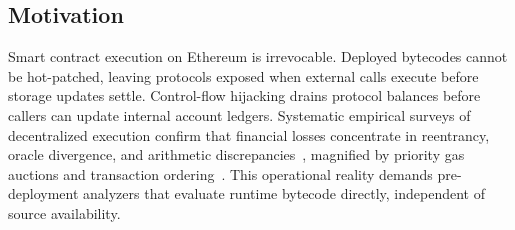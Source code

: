 \documentclass[pdflatex,sn-mathphys]{sn-jnl}
\theoremstyle{thmstyleone}
\theoremstyle{thmstyletwo}
\begin{document}
\subsection{Motivation}\label{sec:intro:motivation}
Smart contract execution on Ethereum is irrevocable. Deployed bytecodes cannot be hot-patched, leaving protocols exposed when external calls execute before storage updates settle. Control-flow hijacking drains protocol balances before callers can update internal account ledgers. Systematic empirical surveys of decentralized execution confirm that financial losses concentrate in reentrancy, oracle divergence, and arithmetic discrepancies~\cite{zhou2023sok,chen2020survey}, magnified by priority gas auctions and transaction ordering~\cite{daian2020flash}. This operational reality demands pre-deployment analyzers that evaluate runtime bytecode directly, independent of source availability.
\end{document}
